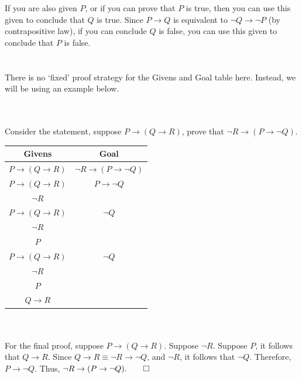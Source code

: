 \documentclass[../setup.tex]{subfiles}
\begin{document}
\begin{theorem}
	If you are also given $P$, or if you can prove that $P$ is true, then you can use this given to conclude that $Q$ is true. Since $P \rightarrow Q$ is equivalent to $\lnot{Q} \rightarrow \lnot{P}$ (by contrapositive law), if you can conclude $Q$ is false, you can use this given to conclude that $P$ is false. \\
	\phantom \\ \\
	There is no `fixed' proof strategy for the Givens and Goal table here. Instead, we will be using an example below.
\end{theorem}
\phantom \\ \\
Consider the statement, suppose $P \rightarrow (Q \rightarrow R)$, prove that $\lnot{R} \rightarrow (P \rightarrow \lnot{Q})$. \\
\begin{center}
	\begin{tabular}[t]{| c | c |}
		\hline
		Givens  & Goal  \\
		\hline
		$P \rightarrow (Q \rightarrow R)$ & $\lnot{R} \rightarrow (P \rightarrow \lnot{Q})$ \\
		\hline
		$P \rightarrow (Q \rightarrow R)$ & $P \rightarrow \lnot{Q}$ \\
		$\lnot{R}$ & \\
		\hline
		$P \rightarrow (Q \rightarrow R)$ & $\lnot{Q}$ \\
		$\lnot{R}$ & \\	
		$P$ & \\
		\hline
		$P \rightarrow (Q \rightarrow R)$ & $\lnot{Q}$ \\
		$\lnot{R}$ & \\	
		$P$ & \\
		$Q \rightarrow R$ & \\
		\hline
	\end{tabular}
\end{center}
\phantom \\ \\
For the final proof, suppose $P \rightarrow (Q \rightarrow R)$. Suppose $\lnot{R}$. Suppose $P$, it follows that $Q \rightarrow R$. Since $Q \rightarrow R \equiv \lnot{R} \rightarrow \lnot{Q}$, and $\lnot{R}$, it follows that $\lnot{Q}$. Therefore, $P \rightarrow \lnot{Q}$. Thus, $\lnot{R} \rightarrow (P \rightarrow \lnot{Q}). \qed$ \\
\end{document}
